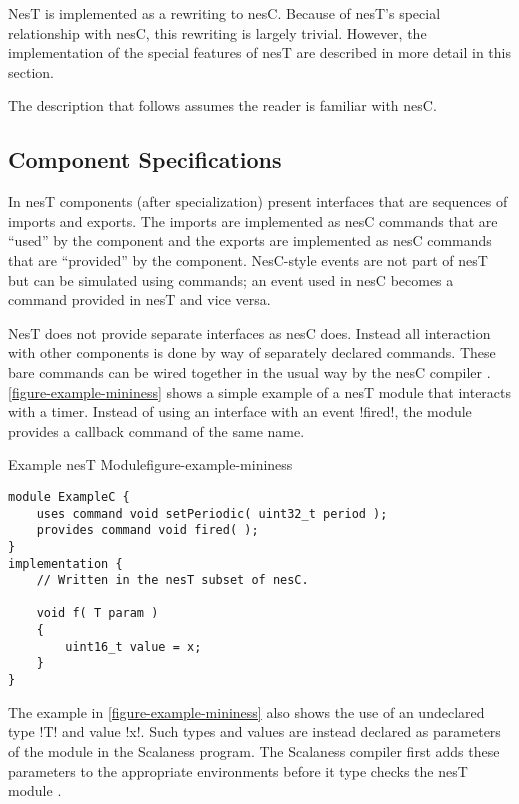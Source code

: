 NesT is implemented as a rewriting to nesC. Because of nesT's special relationship with nesC,
this rewriting is largely trivial. However, the implementation of the special features of nesT
are described in more detail in this section.

The description that follows assumes the reader is familiar with nesC.

\subsection{Component Specifications}
\label{section-component-specifications}

In nesT components (after specialization) present interfaces that are sequences of imports and
exports. The imports are implemented as nesC commands that are ``used'' by the component and the
exports are implemented as nesC commands that are ``provided'' by the component. NesC-style
events are not part of nesT but can be simulated using commands; an event used in nesC becomes a
command provided in nesT and vice versa.


NesT does not provide separate interfaces as nesC does. Instead all interaction with other
components is done by way of separately declared commands. These bare commands can be wired
together in the usual way by the nesC compiler \cite{Gay-nesC-2003}.
\autoref{figure-example-mininess} shows a simple example of a nesT module that interacts with a
timer. Instead of using an interface with an event !fired!, the module provides a callback
command of the same name.

\singlespace
\begin{fpfig}[tbhp]{Example nesT Module}{figure-example-mininess}
{
\begin{lstlisting}[language=nesC]
module ExampleC {
    uses command void setPeriodic( uint32_t period );
    provides command void fired( );
}
implementation {
    // Written in the nesT subset of nesC.

    void f( T param )
    {
        uint16_t value = x;
    }
}
\end{lstlisting}
}
\end{fpfig}
\primaryspacing

The example in \autoref{figure-example-mininess} also shows the use of an undeclared type !T!
and value !x!. Such types and values are instead declared as parameters of the module in the
Scalaness program. The Scalaness compiler first adds these parameters to the appropriate
environments before it type checks the nesT module \cite{watson-masters-2013}.

